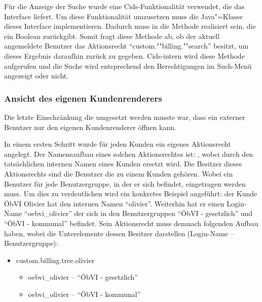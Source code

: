 Für die Anzeige der Suche wurde eine Cids-Funktionalität verwendet, die das Interface  liefert.
Um diese Funktionalität umzusetzen muss die Java"=Klasse  dieses Interface implementieren.
Dadurch muss in  die Methode  realisiert sein, die ein Boolean zurückgibt.
Somit fragt diese Methode ab, ob der aktuell angemeldete Benutzer das Aktionsrecht "`custom.""billing.""search"' besitzt, um dieses Ergebnis daraufhin zurück zu gegeben.
Cids-intern wird diese Methode aufgerufen und die Suche wird entsprechend den Berechtigungen im Such-Menü angezeigt oder nicht. 

\subsubsection{Ansicht des eigenen Kundenrenderers}
Die letzte Einschränkung die umgesetzt werden musste war, dass ein externer Benutzer nur den eigenen Kundenrenderer öffnen kann.

In einem ersten Schritt wurde für jeden Kunden ein eigenes Aktionsrecht angelegt.
Der Namensaufbau eines solchen Aktionsrechtes ist: , wobei  durch den tatsächlichen internen Namen eines Kunden ersetzt wird.
Die Besitzer dieses Aktionsrechts sind die Benutzer die zu einem Kunden gehören. 
Wobei ein Benutzer für jede Benutzergruppe, in der er sich befindet, eingetragen werden muss.
Um dies zu verdeutlichen wird ein konkretes Beispiel angeführt: der Kunde \ac{ÖbVI} Olivier hat den internen Namen "`olivier"'.
Weiterhin hat er einen Login-Name "`oebvi\_olivier"' der sich in den Benutzergruppen "`ÖbVI - gesetzlich"' und "`ÖbVI - kommunal"' befindet.
Sein Aktionsrecht muss demnach folgenden Aufbau haben, wobei die Unterelemente dessen Besitzer darstellen (Login-Name -- Benutzergruppe):
\begin{itemize}
\item custom.billing.tree.olivier
\begin{itemize}
\item oebvi\_olivier -- "`ÖbVI - gesetzlich"'
\item oebvi\_olivier -- "`ÖbVI - kommunal"'
\end{itemize}
\end{itemize}

